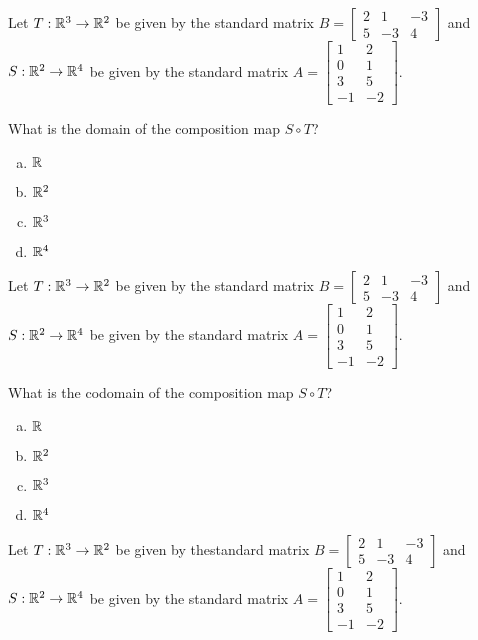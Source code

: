 
\begin{applicationActivities}{1}{21}

\begin{activity}{5}
Let $T: \mathbb{R}^3 \rightarrow \mathbb{R}^2$ be given by the standard matrix $B=\begin{bmatrix} 2 & 1 & -3 \\ 5 & -3 & 4 \end{bmatrix}$ and $S: \mathbb{R}^2 \rightarrow \mathbb{R}^4$ be given by the standard matrix $A=\begin{bmatrix} 1 & 2 \\ 0 & 1 \\ 3 & 5 \\ -1 & -2 \end{bmatrix}$.

What is the domain of the composition map $S \circ T$?
\begin{enumerate}[(a)]
\item $\mathbb{R}$
\item $\mathbb{R}^2$
\item $\mathbb{R}^3$
\item $\mathbb{R}^4$
\end{enumerate}
\end{activity}

\begin{activity}{2}
Let $T: \mathbb{R}^3 \rightarrow \mathbb{R}^2$ be given by the standard matrix $B=\begin{bmatrix} 2 & 1 & -3 \\ 5 & -3 & 4 \end{bmatrix}$ and $S: \mathbb{R}^2 \rightarrow \mathbb{R}^4$ be given by the standard matrix $A=\begin{bmatrix} 1 & 2 \\ 0 & 1 \\ 3 & 5 \\ -1 & -2 \end{bmatrix}$.

What is the codomain of the composition map $S \circ T$?
\begin{enumerate}[(a)]
\item $\mathbb{R}$
\item $\mathbb{R}^2$
\item $\mathbb{R}^3$
\item $\mathbb{R}^4$
\end{enumerate}
\end{activity}

\begin{activity}{2}
Let $T: \mathbb{R}^3 \rightarrow \mathbb{R}^2$ be given by thestandard  matrix $B=\begin{bmatrix} 2 & 1 & -3 \\ 5 & -3 & 4 \end{bmatrix}$ and $S: \mathbb{R}^2 \rightarrow \mathbb{R}^4$ be given by the standard matrix $A=\begin{bmatrix} 1 & 2 \\ 0 & 1 \\ 3 & 5 \\ -1 & -2 \end{bmatrix}$.


\end{activity}
\end{applicationActivities}
